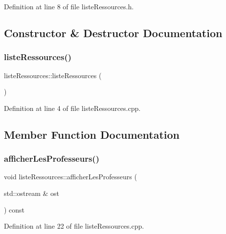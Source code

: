 Definition at line 8 of file liste\+Ressources.\+h.



\subsection{Constructor \& Destructor Documentation}
\hypertarget{classliste_ressources_a3f49a0916898d200295e0e6593253e73}{}\label{classliste_ressources_a3f49a0916898d200295e0e6593253e73} 
\subsubsection{\texorpdfstring{liste\+Ressources()}{listeRessources()}}
{\footnotesize\ttfamily liste\+Ressources\+::liste\+Ressources (\begin{DoxyParamCaption}{ }\end{DoxyParamCaption})}



Definition at line 4 of file liste\+Ressources.\+cpp.



\subsection{Member Function Documentation}
\hypertarget{classliste_ressources_a8459ff3010ad07d1ec5b23d73fad6911}{}\label{classliste_ressources_a8459ff3010ad07d1ec5b23d73fad6911} 
\subsubsection{\texorpdfstring{afficher\+Les\+Professeurs()}{afficherLesProfesseurs()}}
{\footnotesize\ttfamily void liste\+Ressources\+::afficher\+Les\+Professeurs (\begin{DoxyParamCaption}\item[{std\+::ostream \&}]{ost }\end{DoxyParamCaption}) const}



Definition at line 22 of file liste\+Ressources.\+cpp.

